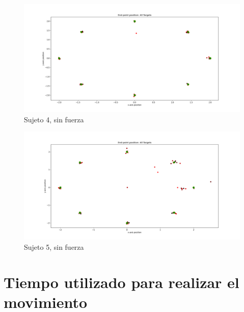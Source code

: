 \documentclass[a4paper,11pt, oneside]{book}
\begin{document}
\begin{figure}[H]
	\centering
	\includegraphics[width=\linewidth]{sujeto4/no_force/trayectorias_puntos}
	\caption{Sujeto 4, sin fuerza}
	\label{4-1-1}
\end{figure}
\begin{figure}[H]
	\centering
	\includegraphics[width=\linewidth]{sujeto5/no_force/trayectorias_puntos}
	\caption{Sujeto 5, sin fuerza}
	\label{5-1-1}
\end{figure}


\section{Tiempo utilizado para realizar el movimiento}
\label{anexo:2}
\end{document}

